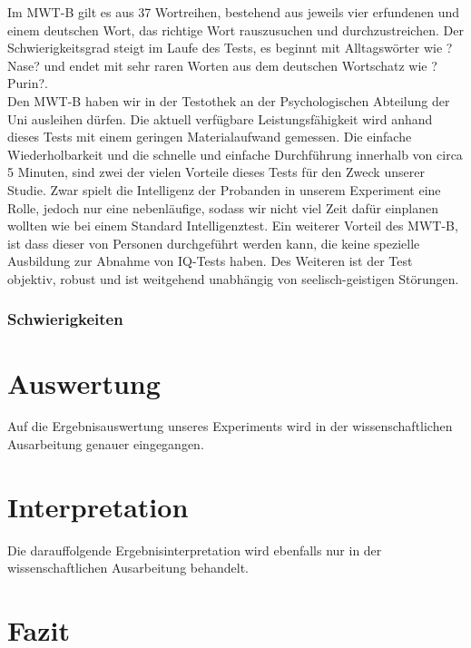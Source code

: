 \documentclass{Bericht}
\begin{document}
Im MWT-B gilt es aus 37 Wortreihen, bestehend aus jeweils vier erfundenen und einem deutschen Wort, das richtige Wort rauszusuchen und durchzustreichen. Der Schwierigkeitsgrad steigt im Laufe des Tests, es beginnt mit Alltagswörter wie ?Nase? und endet mit sehr raren Worten aus dem deutschen Wortschatz wie ?Purin?. \\

Den MWT-B haben wir in der Testothek an der Psychologischen Abteilung der Uni ausleihen dürfen. Die aktuell verfügbare Leistungsfähigkeit wird anhand dieses Tests mit einem geringen Materialaufwand gemessen. Die einfache Wiederholbarkeit und die schnelle und einfache Durchführung innerhalb von circa 5 Minuten, sind zwei der vielen Vorteile dieses Tests für den Zweck unserer Studie. Zwar spielt die Intelligenz der Probanden in unserem Experiment eine Rolle, jedoch nur eine nebenläufige, sodass wir nicht viel Zeit dafür einplanen wollten wie bei einem Standard Intelligenztest. Ein weiterer Vorteil des MWT-B, ist dass dieser von Personen durchgeführt werden kann, die keine spezielle Ausbildung zur Abnahme von IQ-Tests haben. Des Weiteren ist der Test objektiv, robust und ist weitgehend unabhängig von seelisch-geistigen Störungen. \\

	
\subsubsection{Schwierigkeiten}


\section{Auswertung}
	Auf die Ergebnisauswertung unseres Experiments wird in der wissenschaftlichen Ausarbeitung genauer eingegangen.

\section{Interpretation}
	Die darauffolgende Ergebnisinterpretation  wird ebenfalls nur in der wissenschaftlichen Ausarbeitung behandelt.
	
\section{Fazit}
\end{document}
